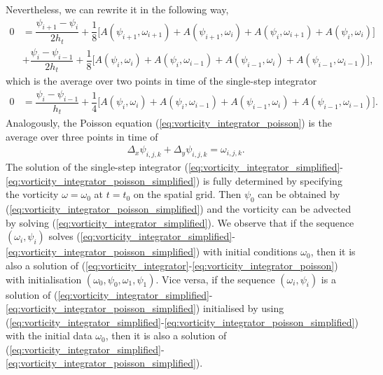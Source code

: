 \documentclass[12pt,a4paper,reqno]{article}
\begin{document}
Nevertheless, we can rewrite it in the following way,
\begin{align}\label{eq:vorticity_integrator_rewritten}
\nonumber
0
&= \dfrac{\psi_{i+1} - \psi_{i}}{2 h_{t}}
 + \dfrac{1}{8} \Big[ A (\psi_{i+1}, \omega_{i+1}) + A (\psi_{i+1}, \omega_{i}) + A (\psi_{i}, \omega_{i+1}) + A(\psi_{i}, \omega_{i}) \Big] \\
&+ \dfrac{\psi_{i} - \psi_{i-1}}{2 h_{t}}
 + \dfrac{1}{8} \Big[ A(\psi_{i}, \omega_{i}) + A(\psi_{i}, \omega_{i-1}) + A (\psi_{i-1}, \omega_{i}) + A (\psi_{i-1}, \omega_{i-1}) \Big] ,
\end{align}
which is the average over two points in time of the single-step integrator
\begin{align}\label{eq:vorticity_integrator_simplified}
0
&= \dfrac{\psi_{i} - \psi_{i-1}}{h_{t}}
 + \dfrac{1}{4} \Big[ A(\psi_{i}, \omega_{i}) + A(\psi_{i}, \omega_{i-1}) + A (\psi_{i-1}, \omega_{i}) + A (\psi_{i-1}, \omega_{i-1}) \Big] .
\end{align}
Analogously, the Poisson equation (\ref{eq:vorticity_integrator_poisson}) is the average over three points in time of
\begin{align}\label{eq:vorticity_integrator_poisson_simplified}
& \Delta_{x} \psi_{i,j,k} + \Delta_{y} \psi_{i,j,k} = \omega_{i,j,k} .
\end{align}
The solution of the single-step integrator (\ref{eq:vorticity_integrator_simplified}-\ref{eq:vorticity_integrator_poisson_simplified}) is fully determined by specifying the vorticity $\omega = \omega_{0}$ at $t=t_{0}$ on the spatial grid.
Then $\psi_{0}$ can be obtained by (\ref{eq:vorticity_integrator_poisson_simplified}) and the vorticity can be advected by solving (\ref{eq:vorticity_integrator_simplified}).
We observe that if the sequence $(\omega_{i}, \psi_{i})$ solves (\ref{eq:vorticity_integrator_simplified}-\ref{eq:vorticity_integrator_poisson_simplified}) with initial conditions $\omega_{0}$, then it is also a solution of (\ref{eq:vorticity_integrator}-\ref{eq:vorticity_integrator_poisson}) with initialisation $(\omega_{0}, \psi_{0}, \omega_{1}, \psi_{1})$.
Vice versa, if the sequence $(\omega_{i}, \psi_{i})$ is a solution of (\ref{eq:vorticity_integrator_simplified}-\ref{eq:vorticity_integrator_poisson_simplified}) initialised by using (\ref{eq:vorticity_integrator_simplified}-\ref{eq:vorticity_integrator_poisson_simplified}) with the initial data $\omega_{0}$, then it is also a solution of (\ref{eq:vorticity_integrator_simplified}-\ref{eq:vorticity_integrator_poisson_simplified}).
\end{document}
